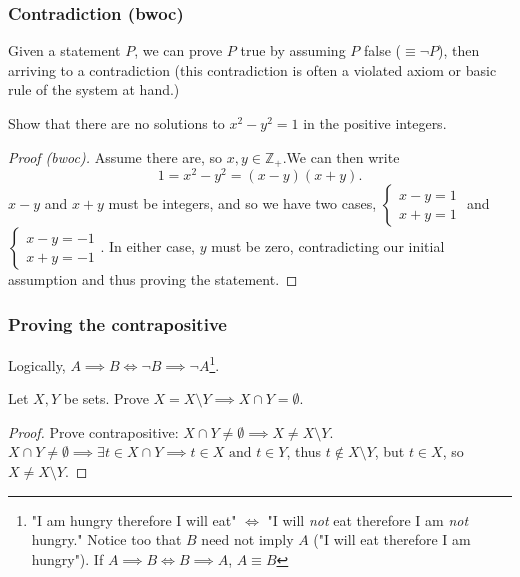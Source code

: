 \documentclass[12pt,oneside]{article}
\begin{document}
\subsubsection{Contradiction (bwoc)}

Given a statement $P$, we can prove $P$ true by assuming $P$ false ($\equiv \neg P$), then arriving to a contradiction (this contradiction is often a violated axiom or basic rule of the system at hand.)
\begin{example}
Show that there are no solutions to $x^2 - y^2 = 1$ in the positive integers.
\begin{proof}[Proof (bwoc)] Assume there are, so $x, y \in \mathbb{Z}_+$.\footnotemark We can then write \[1 = x^2 - y^2 = (x-y)(x+y).\] $x-y$ and $x+y$ must be integers, and so we have two cases, $\begin{cases}
  x-y = 1\\
  x+y = 1
\end{cases}$ and $\begin{cases}
  x-y = -1\\
  x+y = -1
\end{cases}$. In either case, $y$ must be zero, contradicting our initial assumption and thus proving the statement.
\end{proof}
\end{example}


\subsubsection{Proving the contrapositive}
Logically, $A \implies B \iff \neg B \implies \neg A$\footnote{"I am hungry therefore I will eat" $\iff$ "I will \textit{not} eat therefore I am \textit{not} hungry." Notice too that $B$ need not imply $A$ ("I will eat therefore I am hungry"). If $A \implies B \iff B \implies A$, $A \equiv B$}.

\begin{example}
  Let $X,Y$ be sets. Prove $X = X\setminus Y \implies X \cap Y = \emptyset$.
  \begin{proof}[Proof]
    Prove contrapositive: $X \cap Y \neq \emptyset \implies X \neq X \setminus Y$. $X \cap Y \neq \emptyset \implies \exists t \in X \cap Y \implies t \in X \text{ and } t \in Y$, thus $t \notin X\setminus Y$, but $t \in X$, so $X \neq X \setminus Y$.
  \end{proof}
\end{example}
\end{document}

